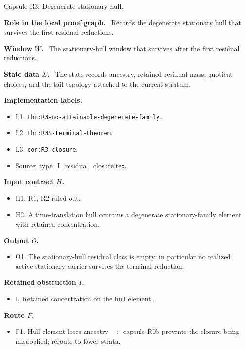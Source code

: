 \documentclass[11pt]{amsart}
\newcommand{\capsulefield}[1]{\par\smallskip\noindent\textbf{#1.}\ }
\begin{document}
\begin{proofcapsule}{Capsule R3: Degenerate stationary hull.}
  \capsulefield{Role in the local proof graph}
  Records the degenerate stationary hull that survives the first residual reductions.

  \capsulefield{Window \(W\)}
The stationary-hull window that survives after the first residual reductions.

  \capsulefield{State data \(\Sigma\)}
The state records ancestry, retained residual mass, quotient choices, and the tail topology attached to the current stratum.

  \capsulefield{Implementation labels}
  \begin{itemize}[leftmargin=1.8em]
  \item L1. \texttt{thm:R3-no-attainable-degenerate-family}.
  \item L2. \texttt{thm:R3S-terminal-theorem}.
  \item L3. \texttt{cor:R3-closure}.
  \item Source: type\_I\_residual\_closure.tex.
  \end{itemize}

  \capsulefield{Input contract \(H\)}
  \begin{itemize}[leftmargin=1.8em]
  \item H1. R1, R2 ruled out.
  \item H2. A time-translation hull contains a degenerate stationary-family element with retained concentration.
  \end{itemize}

  \capsulefield{Output \(O\)}
  \begin{itemize}[leftmargin=1.8em]
  \item O1. The stationary-hull residual class is empty; in particular no realized active stationary carrier survives the terminal reduction.
  \end{itemize}

  \capsulefield{Retained obstruction \(I\)}
  \begin{itemize}[leftmargin=1.8em]
  \item I. Retained concentration on the hull element.
  \end{itemize}

  \capsulefield{Route \(F\)}
  \begin{itemize}[leftmargin=1.8em]
  \item F1. Hull element loses ancestry $\to$ capsule R0b prevents the closure being misapplied; reroute to lower strata.
  \end{itemize}


\end{proofcapsule}
\end{document}
